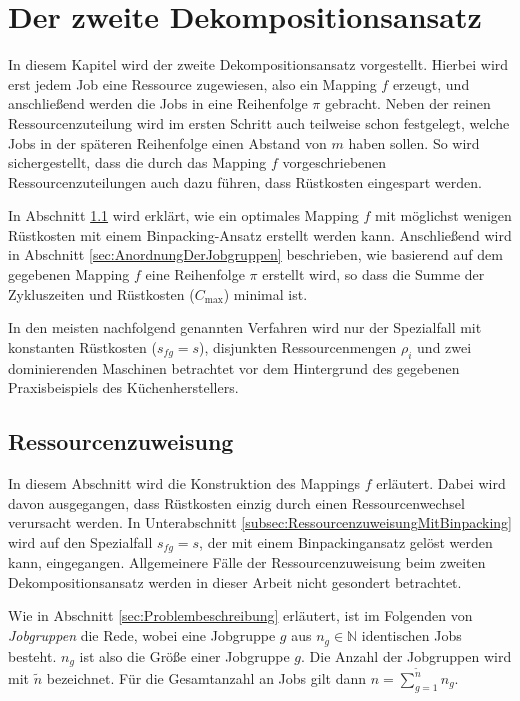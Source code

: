 \documentclass{scrreprt}
\begin{document}
\chapter{Der zweite Dekompositionsansatz}
\label{chap:DerZweiteDekompositionsansatz}
In diesem Kapitel wird der zweite Dekompositionsansatz vorgestellt.
Hierbei wird erst jedem Job eine Ressource zugewiesen, also ein Mapping $f$ erzeugt,
und anschließend werden die Jobs in eine Reihenfolge $\pi$ gebracht.
Neben der reinen Ressourcenzuteilung wird im ersten Schritt auch teilweise schon festgelegt, welche Jobs in der späteren Reihenfolge einen Abstand von $m$ haben sollen.
So wird sichergestellt, dass die durch das Mapping $f$ vorgeschriebenen Ressourcenzuteilungen auch dazu führen, dass Rüstkosten eingespart werden.

In Abschnitt \ref{sec:Ressourcenzuweisung} wird erklärt, wie ein optimales Mapping $f$ mit möglichst wenigen Rüstkosten mit einem Binpacking-Ansatz erstellt werden kann.
Anschließend wird in Abschnitt \ref{sec:AnordnungDerJobgruppen} beschrieben, wie basierend auf dem gegebenen Mapping $f$ eine Reihenfolge $\pi$ erstellt wird,
so dass die Summe der Zykluszeiten und Rüstkosten ($C_{\max}$) minimal ist.

In den meisten nachfolgend genannten Verfahren wird nur der Spezialfall mit konstanten Rüstkosten ($s_{fg}=s$),
disjunkten Ressourcenmengen $\rho_i$ und zwei dominierenden Maschinen betrachtet
vor dem Hintergrund des gegebenen Praxisbeispiels des Küchenherstellers.


\section{Ressourcenzuweisung}
\label{sec:Ressourcenzuweisung}
In diesem Abschnitt wird die Konstruktion des Mappings $f$ erläutert.
Dabei wird davon ausgegangen, dass Rüstkosten einzig durch einen Ressourcenwechsel verursacht werden.
In Unterabschnitt \ref{subsec:RessourcenzuweisungMitBinpacking} wird auf den Spezialfall $s_{fg}=s$, der mit einem Binpackingansatz gelöst werden kann,
eingegangen. Allgemeinere Fälle der Ressourcenzuweisung beim zweiten Dekompositionsansatz werden in dieser Arbeit nicht gesondert betrachtet.

Wie in Abschnitt \ref{sec:Problembeschreibung} erläutert, ist im Folgenden von \textit{Jobgruppen} die Rede, 
wobei eine Jobgruppe $g$ aus $n_g\in\mathbb{N}$ identischen Jobs besteht.
$n_g$ ist also die Größe einer Jobgruppe $g$.
Die Anzahl der Jobgruppen wird mit $\tilde{n}$ bezeichnet.
Für die Gesamtanzahl an Jobs gilt dann $n = \sum_{g=1}^{\tilde{n}} n_g$.
\end{document}
